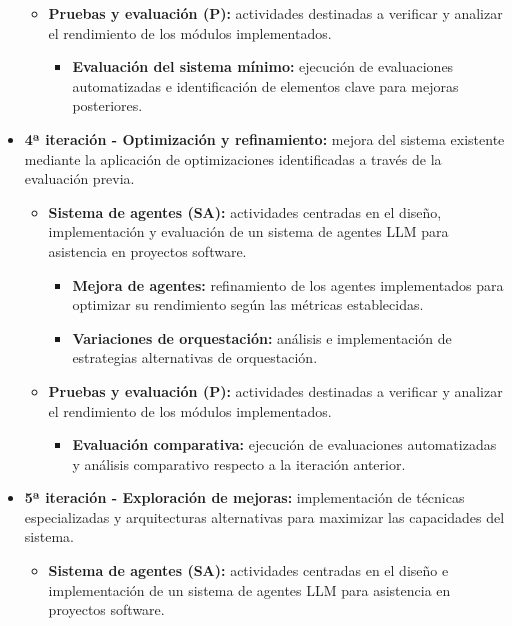 \begin{itemize}
\begin{itemize}
\begin{itemize}
        \end{itemize}
      \item\textbf{Pruebas y evaluación (P):} actividades destinadas a verificar y analizar el rendimiento de los módulos implementados.
        \begin{itemize}
          \item\textbf{Evaluación del sistema mínimo: } ejecución de evaluaciones automatizadas e identificación de elementos clave para mejoras posteriores.
        \end{itemize}
    \end{itemize}
  \item\textbf{4ª iteración - Optimización y refinamiento: }mejora del sistema existente mediante la aplicación de optimizaciones identificadas a través de la evaluación previa.
    \begin{itemize}
      \item\textbf{Sistema de agentes (SA):} actividades centradas en el diseño, implementación y evaluación de un sistema de agentes LLM para asistencia en proyectos software.
        \begin{itemize}
          \item\textbf{Mejora de agentes:} refinamiento de los agentes implementados para optimizar su rendimiento según las métricas establecidas.
          \item\textbf{Variaciones de orquestación:} análisis e implementación de estrategias alternativas de orquestación. 
        \end{itemize}
      \item\textbf{Pruebas y evaluación (P):} actividades destinadas a verificar y analizar el rendimiento de los módulos implementados.
        \begin{itemize}
          \item\textbf{Evaluación comparativa:} ejecución de evaluaciones automatizadas y análisis comparativo respecto a la iteración anterior.
        \end{itemize}
    \end{itemize}
\item\textbf{5ª iteración - Exploración de mejoras: }implementación de técnicas especializadas y arquitecturas alternativas para maximizar las capacidades del sistema.
    \begin{itemize}
      \item\textbf{Sistema de agentes (SA):} actividades centradas en el diseño e implementación de un sistema de agentes LLM para asistencia en proyectos software.

\end{itemize}
\end{itemize}
